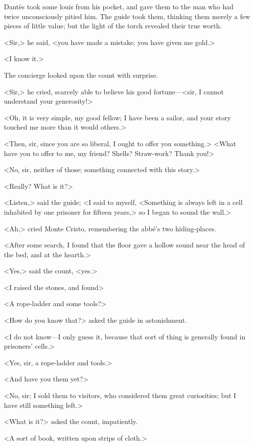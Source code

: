  Dantès took some louis from his pocket, and gave them to the man who had twice unconsciously pitied him. The guide took them, thinking them merely a few pieces of little value; but the light of the torch revealed their true worth. 

 <Sir,> he said, <you have made a mistake; you have given me gold.> 

 <I know it.> 

 The concierge looked upon the count with surprise. 

 <Sir,> he cried, scarcely able to believe his good fortune—<sir, I cannot understand your generosity!> 

 <Oh, it is very simple, my good fellow; I have been a sailor, and your story touched me more than it would others.> 

 <Then, sir, since you are so liberal, I ought to offer you something.>  <What have you to offer to me, my friend? Shells? Straw-work? Thank you!> 

 <No, sir, neither of those; something connected with this story.> 

 <Really? What is it?> 

 <Listen,> said the guide; <I said to myself, <Something is always left in a cell inhabited by one prisoner for fifteen years,> so I began to sound the wall.> 

 <Ah,> cried Monte Cristo, remembering the abbé's two hiding-places. 

 <After some search, I found that the floor gave a hollow sound near the head of the bed, and at the hearth.> 

 <Yes,> said the count, <yes.> 

 <I raised the stones, and found\longdash> 

 <A rope-ladder and some tools?> 

 <How do you know that?> asked the guide in astonishment. 

 <I do not know—I only guess it, because that sort of thing is generally found in prisoners' cells.> 

 <Yes, sir, a rope-ladder and tools.> 

 <And have you them yet?> 

 <No, sir; I sold them to visitors, who considered them great curiosities; but I have still something left.> 

 <What is it?> asked the count, impatiently. 

 <A sort of book, written upon strips of cloth.> 

